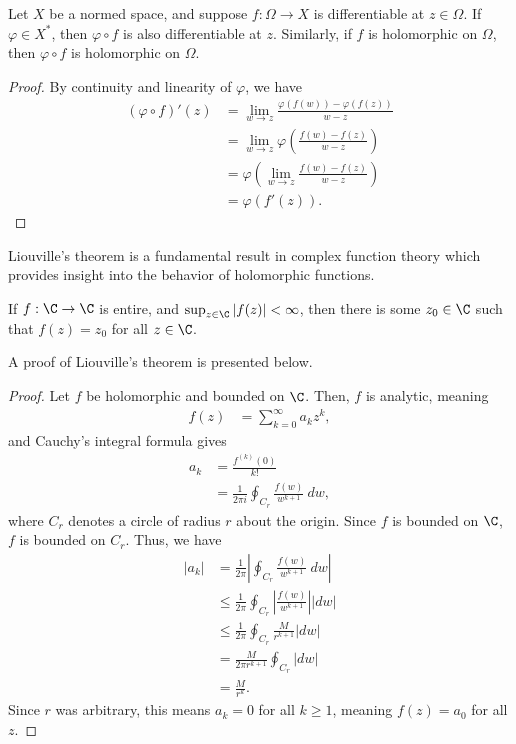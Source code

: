 \documentclass[10pt]{mypackage}
\begin{document}
  \begin{lemma}
    Let $X$ be a normed space, and suppose $f: \Omega\rightarrow X$ is differentiable at $z\in \Omega$. If $\varphi\in X^{\ast}$, then $\varphi\circ f$ is also differentiable at $z$. Similarly, if $f$ is holomorphic on $\Omega$, then $\varphi\circ f$ is holomorphic on $\Omega$.
  \end{lemma}
  \begin{proof}
    By continuity and linearity of $\varphi$, we have
    \begin{align*}
      \left(\varphi\circ f\right)'(z) &= \lim_{w\rightarrow z}\frac{\varphi\left(f(w)\right) - \varphi\left(f(z)\right)}{w-z}\\
                                      &= \lim_{w\rightarrow z}\varphi\left(\frac{f(w)-f(z)}{w-z}\right)\\
                                      &= \varphi\left(\lim_{w\rightarrow z}\frac{f(w)-f(z)}{w-z}\right)\\
                                      &= \varphi\left(f'(z)\right).
    \end{align*}
  \end{proof}
  Liouville's theorem is a fundamental result in complex function theory which provides insight into the behavior of holomorphic functions.
  \begin{theorem}
    If $f: \C\rightarrow \C$ is entire, and $\sup_{z\in \C}\left\vert f(z) \right\vert < \infty$, then there is some $z_0\in \C$ such that $f(z) = z_0$ for all $z\in \C$.
  \end{theorem}
  A proof of Liouville's theorem is presented below.
  \begin{proof}
    Let $f$ be holomorphic and bounded on $\C$. Then, $f$ is analytic, meaning
    \begin{align*}
      f(z) &= \sum_{k=0}^{\infty}a_kz^k,
    \end{align*}
    and Cauchy's integral formula gives
    \begin{align*}
      a_k &= \frac{f^{(k)}(0)}{k!}\\
          &= \frac{1}{2\pi i}\oint_{C_r}\frac{f(w)}{w^{k+1}}\:dw,
    \end{align*}
    where $C_r$ denotes a circle of radius $r$ about the origin. Since $f$ is bounded on $\C$, $f$ is bounded on $C_{r}$. Thus, we have
    \begin{align*}
      \left\vert a_k \right\vert &= \frac{1}{2\pi} \left\vert \oint_{C_r}\frac{f(w)}{w^{k+1}}\:dw \right\vert\\
                                 &\leq \frac{1}{2\pi}\oint_{C_r}\left\vert \frac{f(w)}{w^{k+1}} \right\vert\left\vert dw \right\vert\\
                                 &\leq \frac{1}{2\pi}\oint_{C_r}\frac{M}{r^{k+1}}\left\vert dw \right\vert\\
                                 &= \frac{M}{2\pi r^{k+1}}\oint_{C_r}\left\vert dw \right\vert\\
                                 &= \frac{M}{r^{k}}.
    \end{align*}
    Since $r$ was arbitrary, this means $a_k = 0$ for all $k\geq 1$, meaning $f(z) = a_0$ for all $z$.
  \end{proof}
\end{document}

